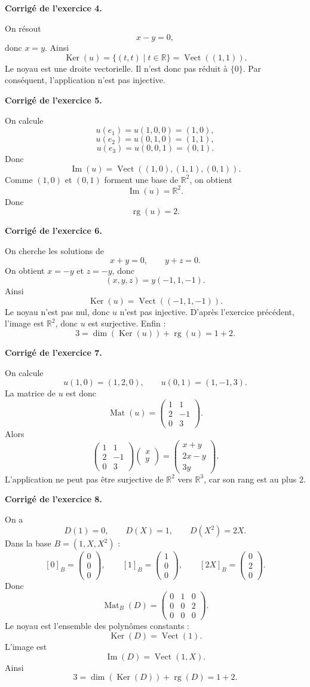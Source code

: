\documentclass[11pt,a4paper]{article}
\newcommand{\corr}[1]{
    \vspace{0.4cm}
    \noindent\textbf{\textcolor{blue!60!black}{Corrigé de l'exercice #1.}}
    \par\vspace{0.1cm}
}
\newcommand{\Ker}{\operatorname{Ker}}
\newcommand{\Img}{\operatorname{Im}}
\newcommand{\rg}{\operatorname{rg}}
\newcommand{\Mat}{\operatorname{Mat}}
\newcommand{\Vect}{\operatorname{Vect}}
\begin{document}
\corr{4}
On résout
\[
x-y=0,
\]
donc $x=y$. Ainsi
\[
\Ker(u)=\{(t,t)\mid t\in\mathbb{R}\}=\Vect((1,1)).
\]
Le noyau est une droite vectorielle. Il n'est donc pas réduit à $\{0\}$. Par conséquent, l'application n'est pas injective.

\corr{5}
On calcule
\[
u(e_1)=u(1,0,0)=(1,0),
\]
\[
u(e_2)=u(0,1,0)=(1,1),
\]
\[
u(e_3)=u(0,0,1)=(0,1).
\]
Donc
\[
\Img(u)=\Vect((1,0),(1,1),(0,1)).
\]
Comme $(1,0)$ et $(0,1)$ forment une base de $\mathbb{R}^2$, on obtient
\[
\Img(u)=\mathbb{R}^2.
\]
Donc
\[
\rg(u)=2.
\]

\corr{6}
On cherche les solutions de
\[
x+y=0,\qquad y+z=0.
\]
On obtient $x=-y$ et $z=-y$, donc
\[
(x,y,z)=y(-1,1,-1).
\]
Ainsi
\[
\Ker(u)=\Vect((-1,1,-1)).
\]
Le noyau n'est pas nul, donc $u$ n'est pas injective. D'après l'exercice précédent, l'image est $\mathbb{R}^2$, donc $u$ est surjective. Enfin :
\[
3=\dim(\Ker(u))+\rg(u)=1+2.
\]

\corr{7}
On calcule
\[
u(1,0)=(1,2,0),\qquad u(0,1)=(1,-1,3).
\]
La matrice de $u$ est donc
\[
\Mat(u)=
\begin{pmatrix}
1&1\\
2&-1\\
0&3
\end{pmatrix}.
\]
Alors
\[
\begin{pmatrix}
1&1\\
2&-1\\
0&3
\end{pmatrix}
\begin{pmatrix}x\\y\end{pmatrix}
=
\begin{pmatrix}
x+y\\
2x-y\\
3y
\end{pmatrix}.
\]
L'application ne peut pas être surjective de $\mathbb{R}^2$ vers $\mathbb{R}^3$, car son rang est au plus $2$.

\corr{8}
On a
\[
D(1)=0,\qquad D(X)=1,\qquad D(X^2)=2X.
\]
Dans la base $B=(1,X,X^2)$ :
\[
[0]_B=\begin{pmatrix}0\\0\\0\end{pmatrix},\qquad
[1]_B=\begin{pmatrix}1\\0\\0\end{pmatrix},\qquad
[2X]_B=\begin{pmatrix}0\\2\\0\end{pmatrix}.
\]
Donc
\[
\Mat_B(D)=
\begin{pmatrix}
0&1&0\\
0&0&2\\
0&0&0
\end{pmatrix}.
\]
Le noyau est l'ensemble des polynômes constants :
\[
\Ker(D)=\Vect(1).
\]
L'image est
\[
\Img(D)=\Vect(1,X).
\]
Ainsi
\[
3=\dim(\Ker(D))+\rg(D)=1+2.
\]
\end{document}
